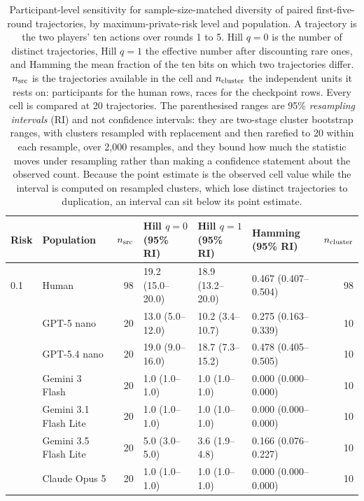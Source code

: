 \documentclass{article}
\begin{document}
\begin{table}[t]
    \caption{Participant-level sensitivity for sample-size-matched diversity of paired first-five-round
    trajectories, by maximum-private-risk level and population. A trajectory
    is the two players' ten actions over rounds 1 to 5. Hill $q{=}0$ is the
    number of distinct trajectories, Hill $q{=}1$ the effective number after
    discounting rare ones, and Hamming the mean fraction of the ten bits on
    which two trajectories differ. $n_{\rm src}$ is the trajectories
    available in the cell and $n_{\rm cluster}$ the independent units it
    rests on: participants for the human rows, races for the checkpoint rows.
    Every cell is compared at 20 trajectories. The parenthesised ranges are
    95\% \emph{resampling intervals} (RI) and not confidence intervals: they
    are two-stage cluster bootstrap ranges, with clusters resampled with
    replacement and then rarefied to 20 within each resample, over 2{,}000
    resamples, and they bound how much the statistic moves under resampling
    rather than making a confidence statement about the observed count.
    Because the point estimate is the observed cell value while the interval is
    computed on resampled clusters, which lose distinct trajectories to
    duplication, an interval can sit below its point estimate.}
    \label{tab:diversity-rarefaction}
    \centering
    \footnotesize
    \setlength{\tabcolsep}{5pt}
    \begin{tabular}{@{}llrlllr@{}}
        \toprule
        Risk & Population & $n_{\rm src}$ & Hill $q{=}0$ (95\% RI)
        & Hill $q{=}1$ (95\% RI) & Hamming (95\% RI) & $n_{\rm cluster}$ \\
        \midrule
        0.1 & Human & 98 & 19.2 (15.0--20.0) & 18.9 (13.2--20.0) & 0.467 (0.407--0.504) & 98 \\
         & GPT-5 nano & 20 & 13.0 (5.0--12.0) & 10.2 (3.4--10.7) & 0.275 (0.163--0.339) & 10 \\
         & GPT-5.4 nano & 20 & 19.0 (9.0--16.0) & 18.7 (7.3--15.2) & 0.478 (0.405--0.505) & 10 \\
         & Gemini 3 Flash & 20 & 1.0 (1.0--1.0) & 1.0 (1.0--1.0) & 0.000 (0.000--0.000) & 10 \\
         & Gemini 3.1 Flash Lite & 20 & 1.0 (1.0--1.0) & 1.0 (1.0--1.0) & 0.000 (0.000--0.000) & 10 \\
         & Gemini 3.5 Flash Lite & 20 & 5.0 (3.0--5.0) & 3.6 (1.9--4.8) & 0.166 (0.076--0.227) & 10 \\
         & Claude Opus 5 & 20 & 1.0 (1.0--1.0) & 1.0 (1.0--1.0) & 0.000 (0.000--0.000) & 10 \\

\end{tabular}
\end{table}
\end{document}
